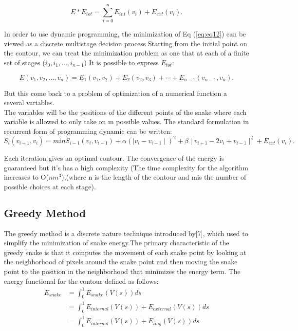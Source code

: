 \begin{equation}
        E * E_{tot} = \sum_{i = 0}^{n} E_{int} (v_i) + E_{ext} (v_i).
        \label{eq:eq12}
\end{equation}

\hspace{-0.6cm}In order to use dynamic programming, the minimization of Eq (\ref{eq:eq12}) can be
viewed as a discrete multistage decision process Starting from the initial point
on the contour, we can treat the minimization problem as one that at each of a
finite set of stages ($i_{0},i_{1},\ldots, i_{n-1}$) It is possible to express $E_{tot}$:

\begin{equation}
        E(v_1,v_2,\ldots,v_n) = E_1(v_1,v_2) + E_2(v_2,v_3) + \cdots + E_{n-1}(v_{n-1},v_{n}).
        \label{eq:eq13}
\end{equation}

\hspace{-0.6cm}But this come back to a problem of optimization of a numerical function a
several variables. \\
The variables will be the positions of the different points of
the snake where each variable is allowed to only take on m possible values. The
standard formulation in recurrent form of programming dynamic can be
written:\\

\begin{equation}
        S_i(v_{i+1},v_i) = min S_{i-1}(v_i,v_{i-1}) + \alpha (\mid v_i - v_{i-1} \mid)^2 + \beta \mid v_{i+1} - 2v_i + v_{i-1} \mid ^2 + E_{ext}(v_i).
        \label{eq:eq14}
\end{equation}

\hspace{-0.6cm}Each iteration gives an optimal contour. The convergence of the energy is
guaranteed but it's has a high complexity (The time complexity for the
algorithm increases to O($nm^3$),(where n is the length of the contour and mis
the number of possible choices at each stage).

\subsection{Greedy Method}\label{subsec:greedy-method}
The greedy method is a discrete nature technique introduced by[7], which used
to simplify the minimization of snake energy.The primary characteristic of the
greedy snake is that it computes the movement of each snake point by looking
at the neighborhood of pixels around the snake point and then moving the
snake point to the position in the neighborhood that minimizes the energy
term. The energy functional for the contour defined as follows:
\begin{equation}
        \begin{aligned}
                E_{snake} & = \int_{0}^{1} E_{snake}(V(s)) ds \\
                & = \int_{0}^{1} E_{internal}(V(s)) + E_{external}(V(s)) ds \\
                & = \int_{0}^{1} E_{internal}(V(s)) + E_{img}(V(s)) ds
        \end{aligned}
        \label{eq:eq15}
\end{equation}

